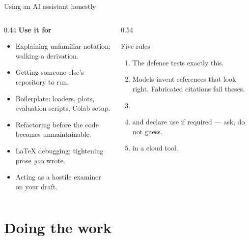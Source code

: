\documentclass[aspectratio=169,11pt]{beamer}
\begin{document}
\begin{frame}{Using an AI assistant honestly}
\begin{columns}[T]
\begin{column}{0.44\textwidth}
\textbf{Use it for}
\footnotesize
\begin{itemize}
  \item Explaining unfamiliar notation; walking a derivation.
  \item Getting someone else's repository to run.
  \item Boilerplate: loaders, plots, evaluation scripts, Colab setup.
  \item Refactoring before the code becomes unmaintainable.
  \item LaTeX debugging; tightening prose \emph{you} wrote.
  \item Acting as a hostile examiner on your draft.
\end{itemize}
\end{column}
\begin{column}{0.54\textwidth}
\begin{alertblock}{Five rules}
\footnotesize
\begin{enumerate}
  \item {} The defence
        tests exactly this.
  \item {} Models invent references
        that look right. Fabricated citations fail theses.
  \item {}
  \item {} and declare use if required ---
        ask, do not guess.
  \item {} in a cloud tool.
\end{enumerate}
\end{alertblock}
\end{column}
\end{columns}
\end{frame}

\section{Doing the work}
\end{document}
